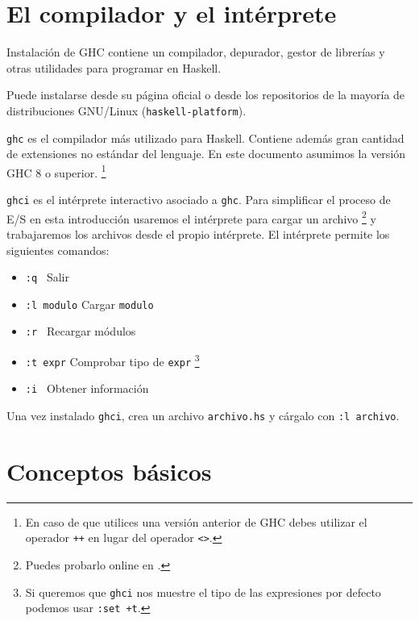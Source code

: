 \section {El compilador y el intérprete}

\begin{otro}{Instalación de GHC}
contiene un compilador, depurador, gestor de librerías y otras utilidades
para programar en Haskell.

Puede instalarse desde su página oficial o desde los
repositorios de la mayoría de distribuciones GNU/Linux
(\texttt{haskell-platform}).
\end{otro}

\texttt{ghc} es el compilador más utilizado para Haskell. Contiene además gran cantidad
de extensiones no estándar del lenguaje. En este documento asumimos la versión GHC 8 o superior.
\footnote{En caso de que utilices una versión anterior de GHC debes utilizar el operador \texttt{++} en lugar del operador \texttt{<>}.}

\texttt{ghci} es el intérprete interactivo asociado a \texttt{ghc}.
Para simplificar el proceso de E/S en esta introducción usaremos el intérprete
para cargar un archivo \footnote{Puedes probarlo online en .}
y trabajaremos los archivos desde el propio intérprete.
El intérprete permite los siguientes comandos:

\begin{itemize}
 \item \texttt{:q \phantom{modulo}} \qquad  Salir
 \item \texttt{:l modulo} \qquad  Cargar \texttt{modulo}
 \item \texttt{:r \phantom{modulo}} \qquad  Recargar módulos
 \item \texttt{:t expr\phantom{lo}} \qquad  Comprobar tipo de \texttt{expr} \footnote{
 Si queremos que \texttt{ghci} nos muestre el tipo de las expresiones por defecto
 podemos usar \texttt{:set +t}.}
 \item \texttt{:i \phantom{modulo}} \qquad  Obtener información
\end{itemize}

Una vez instalado \texttt{ghci}, crea un archivo \texttt{archivo.hs} y
cárgalo con \texttt{:l archivo}.

\section{Conceptos básicos}

